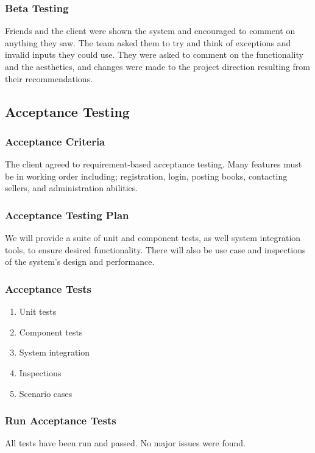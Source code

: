\documentclass[11pt]{article}
\begin{document}
		\subsubsection{Beta Testing}

			Friends and the client were shown the system and encouraged to comment on anything they saw. 
			The team asked them to try and think of exceptions and invalid inputs they could use. 
			They were asked to comment on the functionality and the aesthetics, and changes were made to the project direction resulting from their recommendations.

	\subsection{Acceptance Testing}

		\subsubsection{Acceptance Criteria}

			The client agreed to requirement-based acceptance testing. 
			Many features must be in working order including; registration, login, posting books, contacting sellers, and administration abilities.

		\subsubsection{Acceptance Testing Plan}

			We will provide a suite of unit and component tests, as well system integration tools, to ensure desired functionality. 
			There will also be use case and inspections of the system's design and performance.

		\subsubsection{Acceptance Tests}
			\begin{enumerate}
				\item Unit tests
				\item Component tests
				\item System integration
				\item Inspections
				\item Scenario cases
			\end{enumerate}

		\subsubsection{Run Acceptance Tests}
			All tests have been run and passed. No major issues were found.
\end{document}
